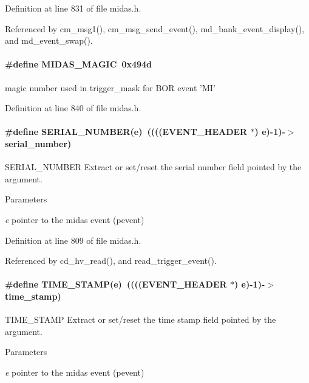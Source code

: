 Definition at line 831 of file midas.h.

Referenced by cm\_\-msg1(), cm\_\-msg\_\-send\_\-event(), md\_\-bank\_\-event\_\-display(), and md\_\-event\_\-swap().
\paragraph[{MIDAS\_\-MAGIC}]{\setlength{\rightskip}{0pt plus 5cm}\#define MIDAS\_\-MAGIC~0x494d}\hfill\label{group__mbufferh_ga028a14f85456b68bf2babd1bdcaa1abb}
magic number used in trigger\_\-mask for BOR event 'MI' 

Definition at line 840 of file midas.h.
\paragraph[{SERIAL\_\-NUMBER}]{\setlength{\rightskip}{0pt plus 5cm}\#define SERIAL\_\-NUMBER(e)~(((({\bf EVENT\_\-HEADER} $\ast$) e)-\/1)-\/$>$serial\_\-number)}\hfill\label{group__mbufferh_gadbb75a9d81e264e357bc5fc73dd4ebb8}
SERIAL\_\-NUMBER Extract or set/reset the serial number field pointed by the argument. 
\begin{DoxyParams}{Parameters}
\item[{\em e}]pointer to the midas event (pevent) \end{DoxyParams}


Definition at line 809 of file midas.h.

Referenced by cd\_\-hv\_\-read(), and read\_\-trigger\_\-event().
\paragraph[{TIME\_\-STAMP}]{\setlength{\rightskip}{0pt plus 5cm}\#define TIME\_\-STAMP(e)~(((({\bf EVENT\_\-HEADER} $\ast$) e)-\/1)-\/$>$time\_\-stamp)}\hfill\label{group__mbufferh_gae8d2f03c283637c81cdcfd3fda065d53}
TIME\_\-STAMP Extract or set/reset the time stamp field pointed by the argument. 
\begin{DoxyParams}{Parameters}
\item[{\em e}]pointer to the midas event (pevent) \end{DoxyParams}


